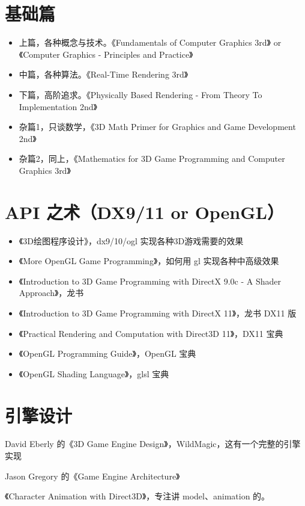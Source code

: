 \documentclass[UTF8,a4paper,12pt]{ctexbook}
\begin{document}
	\section{基础篇}
		\begin{itemize}
			\item 上篇，各种概念与技术。《Fundamentals of Computer Graphics 3rd》 or 《Computer Graphics - Principles and Practice》
			\item 中篇，各种算法。《Real-Time Rendering 3rd》
			\item 下篇，高阶追求。《Physically Based Rendering - From Theory To Implementation 2nd》
			\item 杂篇1，只谈数学，《3D Math Primer for Graphics and Game Development 2nd》
			\item 杂篇2，同上，《Mathematics for 3D Game Programming and Computer Graphics 3rd》
		\end{itemize}
		
	\section{API 之术（DX9/11 or OpenGL）}
		\begin{itemize}
			\item 《3D绘图程序设计》，dx9/10/ogl 实现各种3D游戏需要的效果
			\item 《More OpenGL Game Programming》，如何用 gl 实现各种中高级效果
			\item 《Introduction to 3D Game Programming with DirectX 9.0c - A Shader Approach》，龙书
			\item 《Introduction to 3D Game Programming with DirectX 11》，龙书 DX11 版
			\item 《Practical Rendering and Computation with Direct3D 11》，DX11 宝典
			\item 《OpenGL Programming Guide》，OpenGL 宝典		
			\item 《OpenGL Shading Language》，glsl 宝典			
		\end{itemize}
	
	\section{引擎设计}		
		David Eberly 的《3D Game Engine Design》，WildMagic，这有一个完整的引擎实现
		
		Jason Gregory 的《Game Engine Architecture》
		
		《Character Animation with Direct3D》，专注讲 model、animation 的。
		
\end{document}
